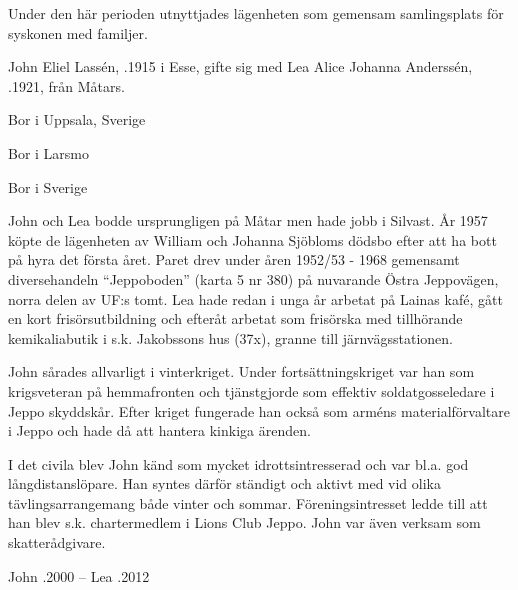 Under den här perioden utnyttjades lägenheten som gemensam samlingsplats för syskonen med familjer.


John Eliel Lassén, .1915 i Esse, gifte sig med Lea Alice Johanna Anderssén, .1921, från Måtars.
\begin{jhchildren}
  \item {} Bor i Uppsala, Sverige
  \item {} Bor i Larsmo
  \item {}
  \item {} Bor i Sverige
  \item {}
\end{jhchildren}


John och Lea bodde ursprungligen på Måtar men hade jobb i Silvast. År 1957 köpte de lägenheten av William och Johanna Sjöbloms dödsbo efter att ha bott på hyra det första året. Paret drev under åren 1952/53 - 1968 gemensamt diversehandeln ``Jeppoboden'' (karta 5 nr 380) på nuvarande Östra Jeppovägen, norra delen av UF:s tomt. Lea hade redan i unga år arbetat på Lainas kafé, gått en kort frisörsutbildning och efteråt arbetat som frisörska med tillhörande kemikaliabutik i s.k. Jakobssons hus (37x), granne till järnvägsstationen.

John sårades allvarligt i vinterkriget. Under fortsättningskriget var han som krigsveteran på hemmafronten och tjänstgjorde som effektiv 	soldatgosseledare i Jeppo skyddskår. Efter kriget fungerade han också som arméns materialförvaltare i Jeppo och hade då att hantera kinkiga ärenden.

I det civila blev John känd som mycket idrottsintresserad och var bl.a. god långdistanslöpare. Han syntes därför ständigt och aktivt med vid olika tävlingsarrangemang både vinter och sommar. Föreningsintresset ledde till att han blev s.k. chartermedlem i Lions Club Jeppo. John var även verksam som skatterådgivare.

John .2000  --  Lea .2012





